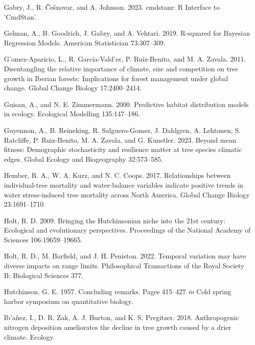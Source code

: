 \documentclass[12pt]{article}
\newlength{\cslhangindent}
\newenvironment{cslreferences}%
  {\setlength{\parindent}{0pt}%
  \everypar{\setlength{\hangindent}{\cslhangindent}}\ignorespaces}%
  {\par}
\begin{document}
\begin{cslreferences}
\leavevmode\hypertarget{ref-cmdstanr}{}%
Gabry, J., R. Češnovar, and A. Johnson. 2023. cmdstanr: R Interface to
'CmdStan'.

\leavevmode\hypertarget{ref-Gelman2019}{}%
Gelman, A., B. Goodrich, J. Gabry, and A. Vehtari. 2019. R-squared for
Bayesian Regression Models. American Statistician 73:307--309.

\leavevmode\hypertarget{ref-GomezAparicio2011}{}%
G\a'omez-Aparicio, L., R. García-Vald\a'es, P. Ruíz-Benito, and M. A.
Zavala. 2011. Disentangling the relative importance of climate, size and
competition on tree growth in Iberian forests: Implications for forest
management under global change. Global Change Biology 17:2400--2414.

\leavevmode\hypertarget{ref-Guisan2000}{}%
Guisan, A., and N. E. Zimmermann. 2000. Predictive habitat distribution
models in ecology. Ecological Modelling 135:147--186.

\leavevmode\hypertarget{ref-Guyennon2023}{}%
Guyennon, A., B. Reineking, R. Salguero-Gomez, J. Dahlgren, A. Lehtonen,
S. Ratcliffe, P. Ruiz-Benito, M. A. Zavala, and G. Kunstler. 2023.
Beyond mean fitness: Demographic stochasticity and resilience matter at
tree species climatic edges. Global Ecology and Biogeography
32:573--585.

\leavevmode\hypertarget{ref-Hember2017}{}%
Hember, R. A., W. A. Kurz, and N. C. Coops. 2017. Relationships between
individual-tree mortality and water-balance variables indicate positive
trends in water stress-induced tree mortality across North America.
Global Change Biology 23:1691--1710.

\leavevmode\hypertarget{ref-Holt2009}{}%
Holt, R. D. 2009. Bringing the Hutchinsonian niche into the 21st
century: Ecological and evolutionary perspectives. Proceedings of the
National Academy of Sciences 106:19659--19665.

\leavevmode\hypertarget{ref-Holt2022}{}%
Holt, R. D., M. Barfield, and J. H. Peniston. 2022. Temporal variation
may have diverse impacts on range limits. Philosophical Transactions of
the Royal Society B: Biological Sciences 377.

\leavevmode\hypertarget{ref-Hutchinson1957}{}%
Hutchinson, G. E. 1957. Concluding remarks. Pages 415--427 \emph{in}
Cold spring harbor symposium on quantitative biology.

\leavevmode\hypertarget{ref-Ibanez2018}{}%
Ib\a'añez, I., D. R. Zak, A. J. Burton, and K. S. Pregitzer. 2018.
Anthropogenic nitrogen deposition ameliorates the decline in tree growth
caused by a drier climate. Ecology.


\end{cslreferences}
\end{document}
